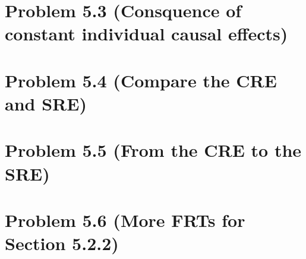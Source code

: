 \documentclass[10pt]{article}
\begin{document}
\section*{Problem 5.3 (Consquence of constant individual causal effects)}

\section*{Problem 5.4 (Compare the CRE and SRE)}

\section*{Problem 5.5 (From the CRE to the SRE)}

\section*{Problem 5.6 (More FRTs for Section 5.2.2)}

\printglossaries
\end{document}
